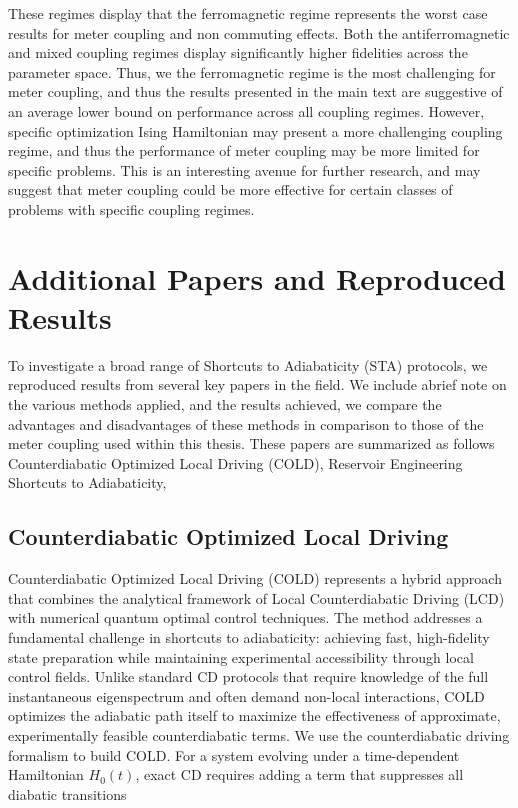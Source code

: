 \qquad These regimes display that the ferromagnetic regime represents the worst case results for meter coupling and non commuting effects. Both the antiferromagnetic and mixed coupling regimes display significantly higher fidelities across the parameter space. Thus, we the ferromagnetic regime is the most challenging for meter coupling, and thus the results presented in the main text are suggestive of an average lower bound on performance across all coupling regimes. However, specific optimization Ising Hamiltonian may present a more challenging coupling regime, and thus the performance of meter coupling may be more limited for specific problems. This is an interesting avenue for further research, and may suggest that meter coupling could be more effective for certain classes of problems with specific coupling regimes.


\newpage
\chapter{Additional Papers and Reproduced Results}
\quad To investigate a broad range of Shortcuts to Adiabaticity (STA) protocols, we reproduced results from several key papers in the field. We include abrief note on the various methods applied, and the results achieved, we compare the advantages and disadvantages of these methods in comparison to those of the meter coupling used within this thesis. These papers are summarized as follows Counterdiabatic Optimized Local Driving (COLD)\cite{COLD2023}, 
Reservoir Engineering Shortcuts to Adiabaticity\cite{ResEngSTA},

\section{Counterdiabatic Optimized Local Driving}

\qquad Counterdiabatic Optimized Local Driving (COLD) represents a hybrid approach that combines the analytical framework of Local Counterdiabatic Driving (LCD) with numerical quantum optimal control techniques\cite{COLD2023}. The method addresses a fundamental challenge in shortcuts to adiabaticity: achieving fast, high-fidelity state preparation while maintaining experimental accessibility through local control fields. Unlike standard CD protocols that require knowledge of the full instantaneous eigenspectrum and often demand non-local interactions, COLD optimizes the adiabatic path itself to maximize the effectiveness of approximate, experimentally feasible counterdiabatic terms. We use the counterdiabatic driving formalism to build COLD. For a system evolving under a time-dependent Hamiltonian $H_0(t)$, exact CD requires adding a term that suppresses all diabatic transitions


